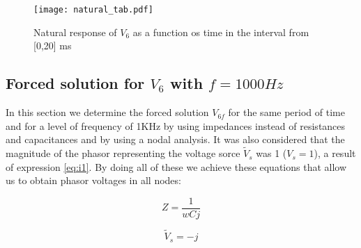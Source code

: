 \begin{figure}[H] \centering
\texttt{[image: natural\_tab.pdf]}
\caption{Natural response of $V_6$ as a function os time in the interval from [0,20] ms}
\label{fig:natural}
\end{figure} 


\pagebreak

\subsection{Forced solution for $V_6$ with $f=1000Hz$}

In this section we  determine the forced solution $V_{6f}$ for the same period of time and for a level of frequency of 1KHz by using impedances instead of resistances and capacitances and by using a nodal analysis. It was also  considered that the magnitude of the phasor representing the voltage sorce $\tilde{V}_s$ was 1 ($V_s=1$), a result of expression \ref{eq:i1}. By doing all of these we achieve these equations that allow us to obtain phasor voltages in all nodes:

\begin {equation}
	Z = \frac{1}{w C j}
	\label{eq:Z}
\end{equation}

\begin {equation}
	\tilde{V}_s = -j
	\label{eq:vs}
\end{equation}

